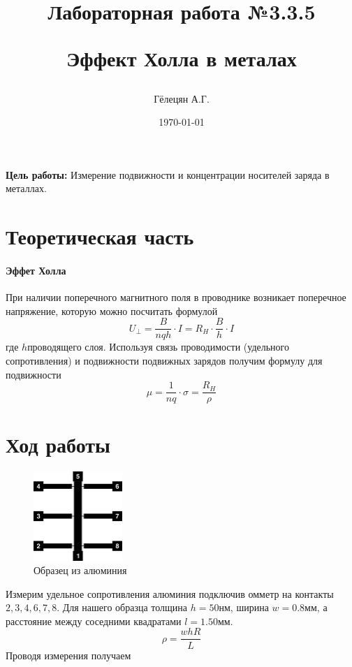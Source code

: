 \documentclass{article}
\title{\begin{center}Лабораторная работа №3.3.5\end{center}
Эффект Холла в металах}
\author{Гёлецян А.Г.}
\date{\today}
\begin{document}
\maketitle
\newpage
{}

\textbf{Цель работы:} Измерение подвижности и концентрации носителей заряда в металлах.

\section{Теоретическая часть}
\paragraph{Эффет Холла}
При наличии поперечного магнитного поля в проводнике возникает поперечное напряжение,
которую можно посчитать формулой
\begin{equation}
U_{\perp} = \frac{B}{nqh} \cdot I = R_{H} \cdot \frac{B}{h} \cdot I
\end{equation}
где $h$ проводящего слоя. Используя связь проводимости (удельного
сопротивления) и подвижности подвижных зарядов получим формулу для подвижности
\begin{equation}
\mu=\frac{1}{nq} \cdot \sigma = \frac{R_{H}}{\rho}
\end{equation}

\section{Ход работы}

\begin{figure}[h]
    \begin{center}
        \includegraphics[width=0.3\textwidth]{spider}
    \end{center}
    \caption{Образец из алюминия}
    \label{spider}
\end{figure}

Измерим удельное сопротивления алюминия подключив омметр на контакты $2,3,4,6,7,8$.
Для нашего образца толщина $h=50нм$, ширина $w=0.8мм$,
а расстояние между соседними квадратами $l=1.50мм$.
\begin{equation*}
    \rho = \frac{whR}{L}
\end{equation*}
Проводя измерения получаем
\end{document}
